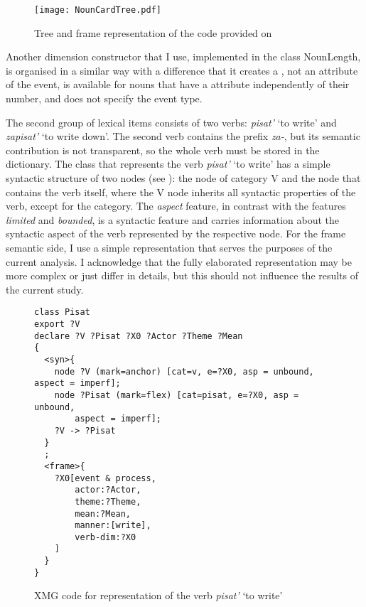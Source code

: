\begin{figure}
\texttt{[image: NounCardTree.pdf]}\\
\caption{Tree and frame representation of the code provided on \label{card:tree:frame}}
\end{figure}

Another dimension constructor that I use, implemented in the class NounLength,  is organised in a similar way with a difference that it creates a \NOUNDIM, not an \MDIM attribute of the event, is available for nouns that have a \LENGTH attribute independently of their number, and does not specify the event type. 

The second group of lexical items consists of two verbs: \textit{pisat'} `to write' and \textit{zapisat'} `to write down'. The second verb contains the prefix \textit{za-}, but its semantic contribution is not transparent, so the whole verb must be stored in the dictionary. The class that represents the verb \textit{pisat'} `to write' has a simple syntactic structure of two nodes (see ): the node of category V and the node that contains the verb itself, where the V node inherits all syntactic properties of the verb, except for the category. The \textit{aspect} feature, in contrast with the features \textit{limited} and \textit{bounded}, is a syntactic feature and carries information about the syntactic aspect of the verb represented by the respective node. For the frame semantic side, I use a simple representation that serves the purposes of the current analysis. I acknowledge that the fully elaborated representation may be more complex or just differ in details, but this should not influence the results of the current study.

\begin{figure}
\begin{verbatim}
class Pisat
export ?V
declare ?V ?Pisat ?X0 ?Actor ?Theme ?Mean
{
  <syn>{
    node ?V (mark=anchor) [cat=v, e=?X0, asp = unbound, aspect = imperf];
    node ?Pisat (mark=flex) [cat=pisat, e=?X0, asp = unbound, 
    	aspect = imperf];
    ?V -> ?Pisat
  }
  ;
  <frame>{
    ?X0[event & process,
        actor:?Actor,
        theme:?Theme,
        mean:?Mean,
        manner:[write],
        verb-dim:?X0
    ]
  }
}
\end{verbatim}
\caption{XMG code for representation of the verb \textit{pisat'} `to write' \label{xmg:pisat}}
\end{figure}

